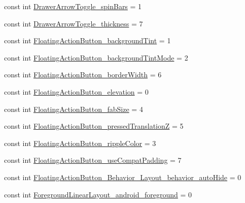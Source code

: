 \begin{DoxyCompactItemize}
\item 
const int \mbox{\hyperlink{class_f_w_p_s___app_1_1_droid_1_1_resource_1_1_styleable_a30d9b5ac78cf806f6afabe89485d4247}{Drawer\+Arrow\+Toggle\+\_\+spin\+Bars}} = 1
\item 
const int \mbox{\hyperlink{class_f_w_p_s___app_1_1_droid_1_1_resource_1_1_styleable_a6ed2a8f80845c863c915490d9c13ce82}{Drawer\+Arrow\+Toggle\+\_\+thickness}} = 7
\item 
const int \mbox{\hyperlink{class_f_w_p_s___app_1_1_droid_1_1_resource_1_1_styleable_aaa437a7b21c46f669b0e417ae9ba47c8}{Floating\+Action\+Button\+\_\+background\+Tint}} = 1
\item 
const int \mbox{\hyperlink{class_f_w_p_s___app_1_1_droid_1_1_resource_1_1_styleable_ac4859b7722237a8cfed5ac508564f3a0}{Floating\+Action\+Button\+\_\+background\+Tint\+Mode}} = 2
\item 
const int \mbox{\hyperlink{class_f_w_p_s___app_1_1_droid_1_1_resource_1_1_styleable_ab01784b4049e4ff1ce98c057524210c0}{Floating\+Action\+Button\+\_\+border\+Width}} = 6
\item 
const int \mbox{\hyperlink{class_f_w_p_s___app_1_1_droid_1_1_resource_1_1_styleable_aadb2646a77e47a71397f09919237fe4e}{Floating\+Action\+Button\+\_\+elevation}} = 0
\item 
const int \mbox{\hyperlink{class_f_w_p_s___app_1_1_droid_1_1_resource_1_1_styleable_a38722b0fde6953bd54732ab36cabd10c}{Floating\+Action\+Button\+\_\+fab\+Size}} = 4
\item 
const int \mbox{\hyperlink{class_f_w_p_s___app_1_1_droid_1_1_resource_1_1_styleable_ad63d607777ac20ef113dc852dd34cbc9}{Floating\+Action\+Button\+\_\+pressed\+TranslationZ}} = 5
\item 
const int \mbox{\hyperlink{class_f_w_p_s___app_1_1_droid_1_1_resource_1_1_styleable_aece9f528bf4892ad5d92ead52a77abd0}{Floating\+Action\+Button\+\_\+ripple\+Color}} = 3
\item 
const int \mbox{\hyperlink{class_f_w_p_s___app_1_1_droid_1_1_resource_1_1_styleable_ad451f141aeffe15120e94cb7a5d5f1ba}{Floating\+Action\+Button\+\_\+use\+Compat\+Padding}} = 7
\item 
const int \mbox{\hyperlink{class_f_w_p_s___app_1_1_droid_1_1_resource_1_1_styleable_a4f94fc488d40ed2b161270e3a7d059ee}{Floating\+Action\+Button\+\_\+\+Behavior\+\_\+\+Layout\+\_\+behavior\+\_\+auto\+Hide}} = 0
\item 
const int \mbox{\hyperlink{class_f_w_p_s___app_1_1_droid_1_1_resource_1_1_styleable_a80afe95a46e8dcd68dcbbf68b5c50ba8}{Foreground\+Linear\+Layout\+\_\+android\+\_\+foreground}} = 0

\end{DoxyCompactItemize}

